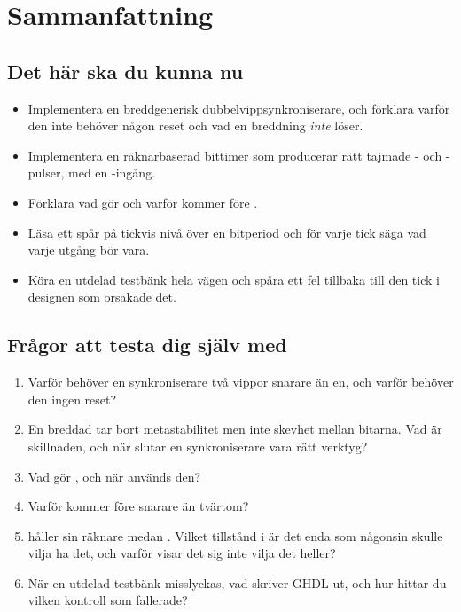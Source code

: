 
\section{Sammanfattning}
\label{c12:sec:review}

\subsection*{Det här ska du kunna nu}
\begin{itemize}
  \item Implementera en breddgenerisk dubbelvippsynkroniserare, och förklara varför den inte behöver
    någon reset och vad en breddning \emph{inte} löser.
  \item Implementera en räknarbaserad bittimer som producerar rätt tajmade - och
    -pulser, med en -ingång.
  \item Förklara vad  gör och varför  kommer före .
  \item Läsa ett spår på tickvis nivå över en bitperiod och för varje tick säga vad varje utgång bör
    vara.
  \item Köra en utdelad testbänk hela vägen och spåra ett fel tillbaka till den tick i designen som
    orsakade det.
\end{itemize}

\subsection*{Frågor att testa dig själv med}
\begin{enumerate}
  \item Varför behöver en synkroniserare två vippor snarare än en, och varför behöver den ingen
    reset?
  \item En breddad  tar bort metastabilitet men inte skevhet mellan bitarna. Vad är
    skillnaden, och när slutar en synkroniserare vara rätt verktyg?
  \item Vad gör , och när används den?
  \item Varför kommer  före  snarare än tvärtom?
  \item {} håller sin räknare medan . Vilket tillstånd i
     är det enda som någonsin skulle vilja ha det, och varför visar det sig inte
    vilja det heller?
  \item När en utdelad testbänk misslyckas, vad skriver GHDL ut, och hur hittar du vilken kontroll
    som fallerade?
\end{enumerate}


